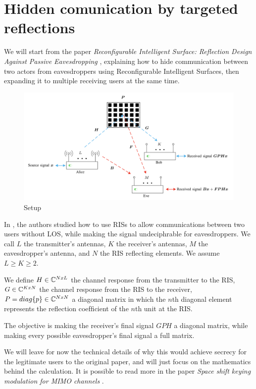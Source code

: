 \section{Hidden comunication by targeted reflections}

We will start from the paper \textit{Reconfigurable Intelligent Surface: Reflection Design Against Passive Eavesdropping} \cite{9328149}, explaining how to hide communication between two actors from eavesdroppers using Reconfigurable Intelligent Surfaces, then expanding it to multiple receiving users at the same time.

\begin{figure}[H]
  \centering
  \includegraphics[width=\linewidth]{imgs/problem-description.png}
  \caption{Setup}
  \label{fig:correlation_sk}
\end{figure}

In \cite{9328149}, the authors studied how to use RISs to allow communications between two users without LOS, while making the signal undeciphrable for eavesdroppers. We call $L$ the transmitter's antennas, $K$ the receiver's antennas, $M$ the eavesdropper's antenna, and $N$ the RIS reflecting elements. We assume $L \ge K \ge 2$.

We define $H \in \mathbb{C}^{NxL}$ the channel response from the transmitter to the RIS, $G \in \mathbb{C}^{KxN}$ the channel response from the RIS to the receiver, $P = diag\{p\} \in \mathbb{C}^{NxN}$ a diagonal matrix in which the $n$th diagonal element represents the reﬂection coefﬁcient of the $n$th unit at the RIS.

The objective is making the receiver's final signal $GPH$ a diagonal matrix, while making every possible eavesdropper's final signal a full matrix.

We will leave for now the technical details of why this would achieve secrecy for the legitimate users to the original paper, and will just focus on the mathematics behind the calculation. It is possible to read more in the paper \textit{Space shift keying modulation for MIMO channels} \cite{5165332}.

